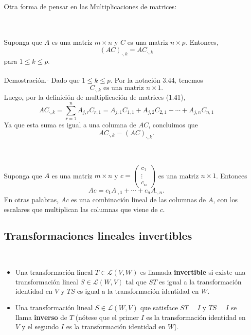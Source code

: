 Otra forma de pensar en las Multiplicaciones de matrices:

\setcounter{myteo}{48}
\begin{myteo}\,\\\\
    Suponga que $A$ es una matriz $m\times n$ y $C$ es una matriz $n\times p$. Entonces,
    $$(AC)_{\cdot,k}=AC_{\cdot,k}$$
    para $1\leq k\leq p$.\\\\
	Demostración.-\; Dado que $1\leq k\leq p$. Por la notación $3.44$, tenemos
	$$C_{\cdot, k} \mbox{ es una matriz } n\times 1.$$
	Luego, por la definición de multiplicación de matrices (1.41),
	$$AC_{\cdot,k}=\sum_{r=1}^n A_{j,r}C_{r,1}=A_{j,1}C_{1,1}+A_{j,2}C_{2,1}+\cdots+A_{j,n}C_{n,1}$$
	Ya que esta suma es igual a una columna de $AC$, concluimos que
	$$AC_{\cdot,k}=(AC)_{\cdot,k}.$$
\end{myteo}

\setcounter{mydef}{51}
\begin{mydef}\,\\\\
    Suponga que $A$ es una matriz $m\times n$ y $c=\begin{pmatrix}c_1\\\vdots\\c_n\end{pmatrix}$ es una matriz $n\times 1$. Entonces
    $$Ac=c_1A_{\cdot,1}+\cdots+c_nA_{\cdot,n}.$$
    En otras palabras, $Ac$ es una combinación lineal de las columnas de $A$, con los escalares que multiplican las columnas que viene de $c$.
\end{mydef} 

\vspace{0.5cm}
\subsection*{Transformaciones lineales invertibles}

\begin{mydef}\,\\
    \begin{itemize}
	\item Una transformación lineal $T\in \mathcal{L}(V,W)$ es llamada \textbf{invertible} si existe una transformación lineal $S\in \mathcal{L}(W,V)$ tal que $ST$ es igual a la transformación identidad en $V$ y $TS$ es igual a la transformación identidad en $W$.
	\item Una transformación lineal $S\in \mathcal{L}(W,V)$ que satisface $ST=I$ y $TS=I$ se llama \textbf{inverso} de $T$ (nótese que el primer $I$ es la transformación identidad en $V$ y el segundo $I$ es la transformación identidad en $W$).
    \end{itemize}
\end{mydef}

